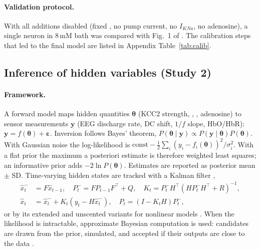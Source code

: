 \paragraph{Validation protocol.} With all additions disabled (fixed \Clm, no pump current, no $I_{KNa}$, no adenosine), a single neuron in 8\,mM bath \Kp{} was compared with Fig.~1 of \cite{cressman2009}. The calibration steps that led to the final model are listed in Appendix Table~\ref{tab:calib}.

\subsection{Inference of hidden variables (Study 2)}
\label{sec:m-inf}

\paragraph{Framework.} A forward model maps hidden quantities $\boldsymbol\theta$ (KCC2 strength, \Cli, \Ko, adenosine) to sensor measurements $\mathbf y$ (EEG discharge rate, DC shift, $1/f$ slope, HbO/HbR): $\mathbf y = f(\boldsymbol\theta)+\boldsymbol\varepsilon$. Inversion follows Bayes' theorem, $P(\boldsymbol\theta\mid\mathbf y) \propto P(\mathbf y\mid\boldsymbol\theta)P(\boldsymbol\theta)$. With Gaussian noise the log-likelihood is $\mathrm{const} - \frac12\sum_i (y_i-f_i(\boldsymbol\theta))^2/\sigma_i^2$. With a flat prior the maximum a posteriori estimate is therefore weighted least squares; an informative prior adds $-2\ln P(\boldsymbol\theta)$. Estimates are reported as posterior mean $\pm$ SD. Time-varying hidden states are tracked with a Kalman filter \cite{kalman1960},
\begin{align}
\hat x_t^- &= F\hat x_{t-1},\quad P_t^- = FP_{t-1}F^\top + Q,\quad K_t = P_t^-H^\top(HP_t^-H^\top+R)^{-1},\\
\hat x_t &= \hat x_t^- + K_t(y_t - H\hat x_t^-),\quad P_t = (I-K_tH)P_t^-,
\end{align}
or by its extended and unscented variants for nonlinear models \cite{wan2000,ullah2010}. When the likelihood is intractable, approximate Bayesian computation is used: candidates are drawn from the prior, simulated, and accepted if their outputs are close to the data \cite{beaumont2002,hashemi2020}.

